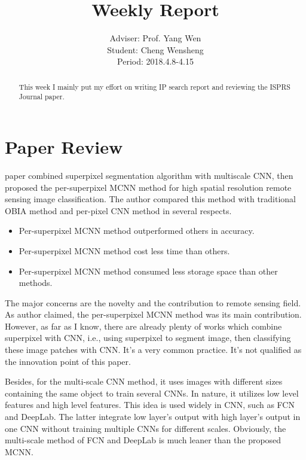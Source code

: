 \documentclass[]{IEEEtran}
\begin{document}
	\title{Weekly Report}
	\author{Adviser: Prof. Yang Wen \\Student: Cheng Wensheng\\ Period: 2018.4.8-4.15
	}
	\maketitle

\begin{abstract}
	This week I mainly put my effort on writing IP search report and reviewing the ISPRS Journal paper.
\end{abstract}

\section{Paper Review}
	 paper combined superpixel segmentation algorithm with multiscale CNN, then proposed the per-superpixel MCNN method for high spatial resolution remote sensing image classification. The author compared this method with traditional OBIA method and per-pixel CNN method in several respects. 
	\begin{itemize}
		\item Per-superpixel MCNN method outperformed others in 	accuracy. 
		\item Per-superpixel MCNN method cost less time than others.
		\item Per-superpixel MCNN method consumed less storage space than other methods. 
	\end{itemize}

	The major concerns are the novelty and the contribution to remote sensing field. As author claimed, the per-superpixel MCNN method was its main contribution. However, as far as I know, there are already plenty of works which combine superpixel with CNN, i.e., using superpixel to segment image, then classifying these image patches with CNN. It’s a very common practice. It’s not qualified as the innovation point of this paper.
	
	Besides, for the multi-scale CNN method, it uses images with different sizes containing the same object to train several CNNs. In nature, it utilizes low level features and high level features. This idea is used widely in CNN, such as FCN and DeepLab. The latter integrate low layer’s output with high layer’s output in one CNN without training multiple CNNs for different scales. Obviously, the multi-scale method of FCN and DeepLab is much leaner than the proposed MCNN.
	
\end{document}
